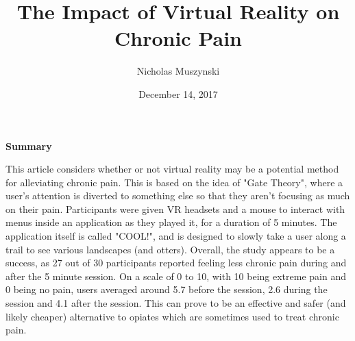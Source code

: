 \documentclass{article}
\begin{document}
\title{The Impact of Virtual Reality on Chronic Pain}
\author{Nicholas Muszynski}
\date{December 14, 2017}

\maketitle

\textbf{Summary}
\newline

This article considers whether or not virtual reality may be a potential method for alleviating chronic pain. 
This is based on the idea of "Gate Theory", where a user's attention is diverted to something else so that they aren't focusing as much on their pain. Participants were given VR headsets and a mouse to interact with menus inside an application as they played it, for a duration of 5 minutes. The application itself is called "COOL!", and is designed to slowly take a user along a trail to see various landscapes (and otters). Overall, the study appears to be a success, as 27 out of 30 participants reported feeling less chronic pain during and after the 5 minute session. On a scale of 0 to 10, with 10 being extreme pain and 0 being no pain, users averaged around 5.7 before the session, 2.6 during the session and 4.1 after the session. This can prove to be an effective and safer (and likely cheaper) alternative to opiates which are sometimes used to treat chronic pain.

\nocite{chronicPainCite}



\end{document}
